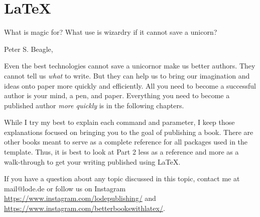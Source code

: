 

\part{LaTeX}\label{latex:prt}

\begin{myquotation}What is magic for? What use is wizardry if it cannot save a unicorn?\par\mbox{}\hfill\emdash{}Peter S. Beagle, \ifxetex\label{beagle-heroes-quote}\else~\citep[cf. p.~187f]{lastunicorn2}\fi\end{myquotation}

Even the best technologies cannot save a unicorn\emdash{}or make us better authors. They cannot tell us \textit{what} to write. But they can help us to bring our imagination and ideas onto paper more quickly and efficiently. All you need to become a successful author is your mind, a pen, and paper. Everything you need to become a published author \textit{more quickly} is in the following chapters.

While I try my best to explain each command and parameter, I keep those explanations focused on bringing you to the goal of publishing a book. There are other books meant to serve as a complete reference for all packages used in the template. Thus, it is best to look at Part 2 less as a reference and more as a walk-through to get your writing published using LaTeX.

If you have a question about any topic discussed in this topic, contact me at mail@lode.de or follow us on Instagram \url{https://www.instagram.com/lodepublishing/} and \url{https://www.instagram.com/betterbookswithlatex/}.